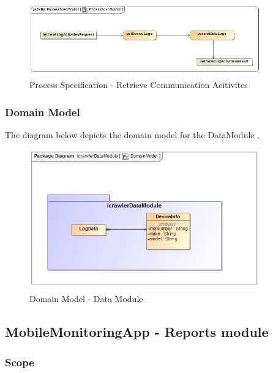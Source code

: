 \documentclass[hidelinks, 12pt, oneside]{article}
\begin{document}
			
			\begin{figure}[!htbp]
    		\centering
    		\includegraphics[width=0.9\textwidth]{img/processSpecificationRetrieveCommunicationActivities.jpg}
    		\caption{Process Specification - Retrieve Communication Acitivites}
    		\label{fig:ProcessSpec_retrieveCommunicationAcitivites}
		\end{figure}
		\newpage
	
		\subsubsection{Domain Model}
		The diagram below depicts the domain model for the DataModule .
		
		
		\begin{figure}[!htbp]
    		\centering
    		\includegraphics[width=0.9\textwidth]{img/DomainModelDataModule.jpg}
    		\caption{Domain Model - Data Module}
    		\label{fig:DomainMod_dataModule}
		\end{figure}
		\newpage
		
	\subsection{MobileMonitoringApp - Reports module}
	\subsubsection{Scope}
	
\end{document}
